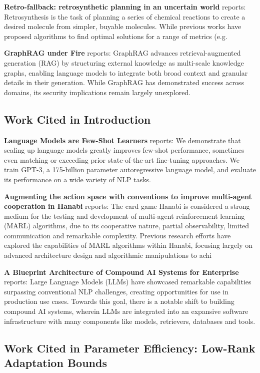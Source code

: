 \documentclass[10pt,twocolumn,letterpaper]{article}
\begin{document}
\textbf{Retro-fallback: retrosynthetic planning in an uncertain world} \cite{arxiv_2310_09270} reports: Retrosynthesis is the task of planning a series of chemical reactions to create a desired molecule from simpler, buyable molecules. While previous works have proposed algorithms to find optimal solutions for a range of metrics (e.g.

\textbf{GraphRAG under Fire} \cite{arxiv_2501_14050} reports: GraphRAG advances retrieval-augmented generation (RAG) by structuring external knowledge as multi-scale knowledge graphs, enabling language models to integrate both broad context and granular details in their generation. While GraphRAG has demonstrated success across domains, its security implications remain largely unexplored.


\subsection{Work Cited in Introduction}


\textbf{Language Models are Few-Shot Learners} \cite{arxiv_2005_14165} reports: We demonstrate that scaling up language models greatly improves few-shot performance, sometimes even matching or exceeding prior state-of-the-art fine-tuning approaches. We train GPT-3, a 175-billion parameter autoregressive language model, and evaluate its performance on a wide variety of NLP tasks.

\textbf{Augmenting the action space with conventions to improve multi-agent cooperation in Hanabi} \cite{arxiv_2412_06333} reports: The card game Hanabi is considered a strong medium for the testing and development of multi-agent reinforcement learning (MARL) algorithms, due to its cooperative nature, partial observability, limited communication and remarkable complexity. Previous research efforts have explored the capabilities of MARL algorithms within Hanabi, focusing largely on advanced architecture design and algorithmic manipulations to achi

\textbf{A Blueprint Architecture of Compound AI Systems for Enterprise} \cite{arxiv_2406_00584} reports: Large Language Models (LLMs) have showcased remarkable capabilities surpassing conventional NLP challenges, creating opportunities for use in production use cases. Towards this goal, there is a notable shift to building compound AI systems, wherein LLMs are integrated into an expansive software infrastructure with many components like models, retrievers, databases and tools.


\subsection{Work Cited in Parameter Efficiency: Low-Rank Adaptation Bounds}
\end{document}
